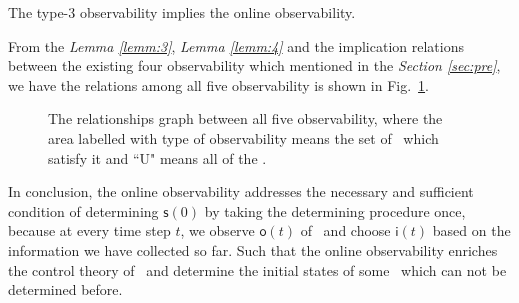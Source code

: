 \begin{lemma}
The  type-3 observability implies the online observability.
\label{lemm:4}
\end{lemma}

From the {\em Lemma \ref{lemm:3}}, {\em Lemma \ref{lemm:4}}  and the implication relations between the existing four observability which mentioned in the {\em Section \ref{sec:pre}}, we have the relations among all five observability is shown in Fig.~\ref{fig:7}.

\begin{figure}[thpb]
      \centering
      \caption{The relationships graph between all five observability, where the area labelled with type of observability means the set of \BCNs\ which satisfy it and  ``U" means all of the \BCNs.}
      \label{fig:7}
   \end{figure}


In conclusion, the online observability addresses the necessary and sufficient condition of determining $\mathsf{s}(0)$ by taking the determining procedure once, because at every time step $t$, we observe $\mathsf{o}(t)$ of \BCN\ and choose $\mathsf{i}(t)$ based on the information we have collected so far. Such that the online observability enriches the control theory of \BCNs\ and determine the initial states of some \BCNs\ which can not be determined before. 